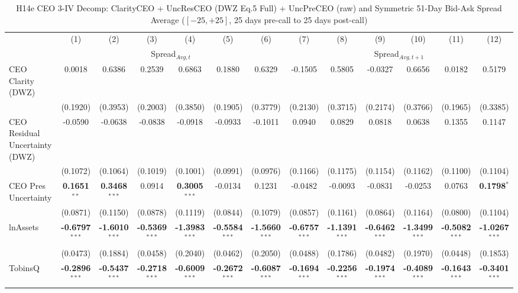 \documentclass[11pt,a4paper]{article}
\begin{document}
\begin{table}[htbp]
\centering
\caption{H14e CEO 3-IV Decomp: ClarityCEO + UncResCEO (DWZ Eq.5 Full) + UncPreCEO (raw) and Symmetric 51-Day Bid-Ask Spread Average ($[-25,+25]$, 25 days pre-call to 25 days post-call)}
\label{tab:h14e_ceo2_decomp}
\scriptsize
\begin{tabular}{lcccccccccccc}
\toprule
 & (1) & (2) & (3) & (4) & (5) & (6) & (7) & (8) & (9) & (10) & (11) & (12) \\
 & \multicolumn{6}{c}{Spread$_{Avg,t}$} & \multicolumn{6}{c}{Spread$_{Avg,t+1}$} \\
\cmidrule(lr){2-7} \cmidrule(lr){8-13}
\midrule
CEO Clarity (DWZ) & 0.0018 & 0.6386 & 0.2539 & 0.6863 & 0.1880 & 0.6329 & -0.1505 & 0.5805 & -0.0327 & 0.6656 & 0.0182 & 0.5179 \\
 & (0.1920) & (0.3953) & (0.2003) & (0.3850) & (0.1905) & (0.3779) & (0.2130) & (0.3715) & (0.2174) & (0.3766) & (0.1965) & (0.3385) \\
CEO Residual Uncertainty (DWZ) & -0.0590 & -0.0638 & -0.0838 & -0.0918 & -0.0933 & -0.1011 & 0.0940 & 0.0829 & 0.0818 & 0.0638 & 0.1355 & 0.1147 \\
 & (0.1072) & (0.1064) & (0.1019) & (0.1001) & (0.0991) & (0.0976) & (0.1166) & (0.1175) & (0.1154) & (0.1162) & (0.1100) & (0.1104) \\
CEO Pres Uncertainty & \textbf{0.1651}$^{**}$ & \textbf{0.3468}$^{***}$ & 0.0914 & \textbf{0.3005}$^{***}$ & -0.0134 & 0.1231 & -0.0482 & -0.0093 & -0.0831 & -0.0253 & 0.0763 & \textbf{0.1798}$^{*}$ \\
 & (0.0871) & (0.1150) & (0.0878) & (0.1119) & (0.0844) & (0.1079) & (0.0857) & (0.1161) & (0.0864) & (0.1164) & (0.0800) & (0.1104) \\
\midrule
lnAssets & \textbf{-0.6797}$^{***}$ & \textbf{-1.6010}$^{***}$ & \textbf{-0.5369}$^{***}$ & \textbf{-1.3983}$^{***}$ & \textbf{-0.5584}$^{***}$ & \textbf{-1.5660}$^{***}$ & \textbf{-0.6757}$^{***}$ & \textbf{-1.1391}$^{***}$ & \textbf{-0.6462}$^{***}$ & \textbf{-1.3499}$^{***}$ & \textbf{-0.5082}$^{***}$ & \textbf{-1.0267}$^{***}$ \\
 & (0.0473) & (0.1884) & (0.0458) & (0.2040) & (0.0462) & (0.2050) & (0.0488) & (0.1786) & (0.0482) & (0.1970) & (0.0448) & (0.1853) \\
TobinsQ & \textbf{-0.2896}$^{***}$ & \textbf{-0.5437}$^{***}$ & \textbf{-0.2718}$^{***}$ & \textbf{-0.6009}$^{***}$ & \textbf{-0.2672}$^{***}$ & \textbf{-0.6087}$^{***}$ & \textbf{-0.1694}$^{***}$ & \textbf{-0.2256}$^{***}$ & \textbf{-0.1974}$^{***}$ & \textbf{-0.4089}$^{***}$ & \textbf{-0.1643}$^{***}$ & \textbf{-0.3401}$^{***}$ \\

\end{tabular}
\end{table}
\end{document}
